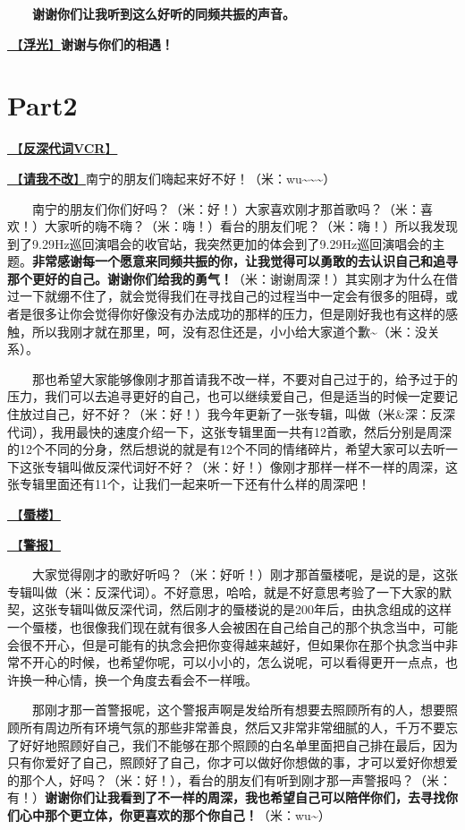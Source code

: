 \documentclass[]{ctexbook}
\begin{document}
  \textbf{谢谢你们让我听到这么好听的同频共振的声音。}

\hyperref[floating-light]{🎵【\textbf{浮光}】}\textbf{谢谢与你们的相遇！}

\section{Part2}\label{nanning-20241207-part2}

\hyperref[senself-vcr]{🎥【\textbf{反深代词VCR}】}

\hyperref[brave-heart]{🎵【\textbf{请我不改}】}南宁的朋友们嗨起来好不好！（米：wu\textasciitilde\textasciitilde\textasciitilde）

  南宁的朋友们你们好吗？（米：好！）大家喜欢刚才那首歌吗？（米：喜欢！）大家听的嗨不嗨？（米：嗨！）看台的朋友们呢？（米：嗨！）所以我发现到了9.29Hz巡回演唱会的收官站，我突然更加的体会到了9.29Hz巡回演唱会的主题。\textbf{非常感谢每一个愿意来同频共振的你，让我觉得可以勇敢的去认识自己和追寻那个更好的自己。谢谢你们给我的勇气！}（米：谢谢周深！）其实刚才为什么在借过一下就绷不住了，就会觉得我们在寻找自己的过程当中一定会有很多的阻碍，或者是很多让你会觉得你好像没有办法成功的那样的压力，但是刚好我也有这样的感触，所以我刚才就在那里，呵，没有忍住还是，小小给大家道个歉\textasciitilde（米：没关系）。

  那也希望大家能够像刚才那首请我不改一样，不要对自己过于的，给予过于的压力，我们可以去追寻更好的自己，也可以继续爱自己，但是适当的时候一定要记住放过自己，好不好？（米：好！）我今年更新了一张专辑，叫做（米\&深：反深代词），我用最快的速度介绍一下，这张专辑里面一共有12首歌，然后分别是周深的12个不同的分身，然后想说的就是有12个不同的情绪碎片，希望大家可以去听一下这张专辑叫做反深代词好不好？（米：好！）像刚才那样一样不一样的周深，这张专辑里面还有11个，让我们一起来听一下还有什么样的周深吧！

\hyperref[mirage]{🎵【\textbf{蜃楼}】}

\hyperref[the-giver]{🎵【\textbf{警报}】}

  大家觉得刚才的歌好听吗？（米：好听！）刚才那首蜃楼呢，是说的是，这张专辑叫做（米：反深代词）。不好意思，哈哈，就是不好意思考验了一下大家的默契，这张专辑叫做反深代词，然后刚才的蜃楼说的是200年后，由执念组成的这样一个蜃楼，也很像我们现在就有很多人会被困在自己给自己的那个执念当中，可能会很不开心，但是可能有的执念会把你变得越来越好，但如果你在那个执念当中非常不开心的时候，也希望你呢，可以小小的，怎么说呢，可以看得更开一点点，也许换一种心情，换一个角度去看会不一样哦。

  那刚才那一首警报呢，这个警报声啊是发给所有想要去照顾所有的人，想要照顾所有周边所有环境气氛的那些非常善良，然后又非常非常细腻的人，千万不要忘了好好地照顾好自己，我们不能够在那个照顾的白名单里面把自己排在最后，因为只有你爱好了自己，照顾好了自己，你才可以做好你想做的事，才可以爱好你想爱的那个人，好吗？（米：好！），看台的朋友们有听到刚才那一声警报吗？（米：有！）\textbf{谢谢你们让我看到了不一样的周深，我也希望自己可以陪伴你们，去寻找你们心中那个更立体，你更喜欢的那个你自己！}（米：wu\textasciitilde）
\end{document}
